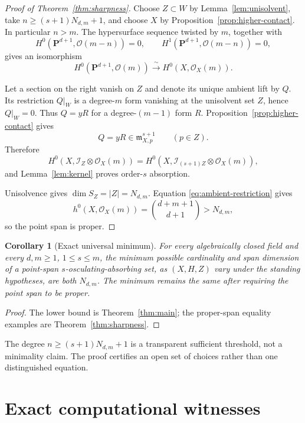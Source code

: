 \documentclass[11pt]{article}
\newtheorem{corollary}[theorem]{Corollary}
\theoremstyle{definition}
\theoremstyle{remark}
\theoremstyle{plain}
\newcommand{\PP}{\mathbf P}
\newcommand{\cO}{\mathcal O}
\newcommand{\cI}{\mathcal I}
\begin{document}
\begin{proof}[Proof of Theorem~\ref{thm:sharpness}]
Choose $Z\subset W$ by Lemma~\ref{lem:unisolvent}, take
$n\geq(s+1)N_{d,m}+1$, and choose $X$ by
Proposition~\ref{prop:higher-contact}.  In particular $n>m$.  The
hypersurface sequence twisted by $m$, together with
\[
 H^0(\PP^{d+1},\cO(m-n))=0,
 \qquad H^1(\PP^{d+1},\cO(m-n))=0,
\]
gives an isomorphism
\begin{equation}\label{eq:ambient-restriction}
 H^0(\PP^{d+1},\cO(m))\xrightarrow{\ \sim\ }
 H^0(X,\cO_X(m)).
\end{equation}

Let a section on the right vanish on $Z$ and denote its unique ambient lift
by $Q$.  Its restriction $Q|_W$ is a degree-$m$ form vanishing at the
unisolvent set $Z$, hence $Q|_W=0$.  Thus $Q=yR$ for a degree-$(m-1)$ form
$R$.  Proposition~\ref{prop:higher-contact} gives
\[
 Q=yR\in\mathfrak m_{X,p}^{s+1}\qquad(p\in Z).
\]
Therefore
\[
 H^0(X,\cI_Z\otimes\cO_X(m))
 =H^0(X,\cI_{(s+1)Z}\otimes\cO_X(m)),
\]
and Lemma~\ref{lem:kernel} proves order-$s$ absorption.

Unisolvence gives $\dim S_Z=|Z|=N_{d,m}$.  Equation
\eqref{eq:ambient-restriction} gives
\[
 h^0(X,\cO_X(m))=\binom{d+m+1}{d+1}>N_{d,m},
\]
so the point span is proper.
\end{proof}

\begin{corollary}[Exact universal minimum]\label{cor:minimum}
For every algebraically closed field and every $d,m\geq1$,
$1\leq s\leq m$, the minimum possible cardinality and span dimension of a
point-span $s$-osculating-absorbing set, as $(X,H,Z)$ vary under the standing
hypotheses, are both $N_{d,m}$.  The minimum remains the same after requiring
the point span to be proper.
\end{corollary}

\begin{proof}
The lower bound is Theorem~\ref{thm:main}; the proper-span equality examples
are Theorem~\ref{thm:sharpness}.
\end{proof}

The degree $n\geq(s+1)N_{d,m}+1$ is a transparent sufficient threshold,
not a minimality claim.  The proof certifies an open set of choices rather
than one distinguished equation.

\section{Exact computational witnesses}
\end{document}
